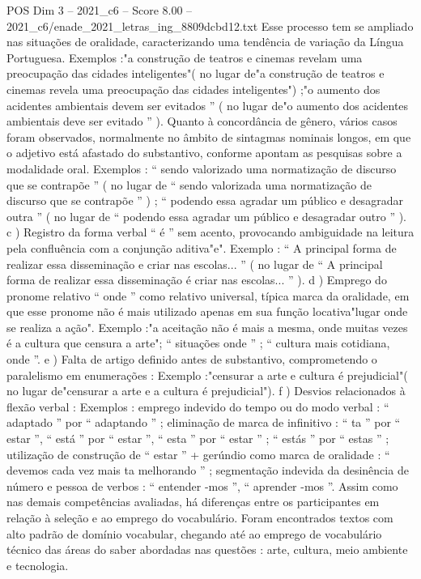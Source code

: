 \begin{textsample}{POS Dim 3 – 2021\_c6 – Score 8.00 – 2021\_c6/enade\_2021\_letras\_ing\_8809dcbd12.txt}
Esse processo tem se ampliado nas situações de oralidade, caracterizando uma tendência de variação da Língua Portuguesa.
Exemplos :"a construção de teatros e cinemas revelam uma preocupação das cidades inteligentes"( no lugar de"a construção de teatros e cinemas revela uma preocupação das cidades inteligentes") ;"o aumento dos acidentes ambientais devem ser evitados ” ( no lugar de"o aumento dos acidentes ambientais deve ser evitado ” ).
Quanto à concordância de gênero, vários casos foram observados, normalmente no âmbito de sintagmas nominais longos, em que o adjetivo está afastado do substantivo, conforme apontam as pesquisas sobre a modalidade oral.
Exemplos : “ sendo valorizado uma normatização de discurso que se contrapõe ” ( no lugar de “ sendo valorizada uma normatização de discurso que se contrapõe ” ) ; “ podendo essa agradar um público e desagradar outra ” ( no lugar de “ podendo essa agradar um público e desagradar outro ” ). c ) Registro da forma verbal “ é ” sem acento, provocando ambiguidade na leitura pela confluência com a conjunção aditiva"e".
Exemplo : “ A principal forma de realizar essa disseminação e criar nas escolas... ” ( no lugar de “ A principal forma de realizar essa disseminação é criar nas escolas... ” ). d ) Emprego do pronome relativo “ onde ” como relativo universal, típica marca da oralidade, em que esse pronome não é mais utilizado apenas em sua função locativa"lugar onde se realiza a ação".
Exemplo :"a aceitação não é mais a mesma, onde muitas vezes é a cultura que censura a arte"; “ situações onde ” ; “ cultura mais cotidiana, onde ”. e ) Falta de artigo definido antes de substantivo, comprometendo o paralelismo em enumerações : Exemplo :"censurar a arte e cultura é prejudicial"( no lugar de"censurar a arte e a cultura é prejudicial"). f ) Desvios relacionados à flexão verbal : Exemplos : emprego indevido do tempo ou do modo verbal : “ adaptado ” por “ adaptando ” ; eliminação de marca de infinitivo : “ ta ” por “ estar ”, “ está ” por “ estar ”, “ esta ” por “ estar ” ; “ estás ” por “ estas ” ; utilização de construção de “ estar ” + gerúndio como marca de oralidade : “ devemos cada vez mais ta melhorando ” ; segmentação indevida da desinência de número e pessoa de verbos : “ entender -mos ”, “ aprender -mos ”.
Assim como nas demais competências avaliadas, há diferenças entre os participantes em relação à seleção e ao emprego do vocabulário.
Foram encontrados textos com alto padrão de domínio vocabular, chegando até ao emprego de vocabulário técnico das áreas do saber abordadas nas questões : arte, cultura, meio ambiente e tecnologia.

\end{textsample}
